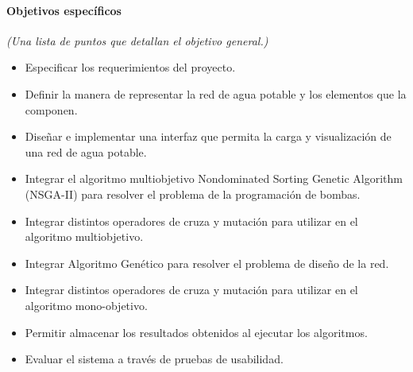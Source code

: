 \documentclass[11pt,letterpaper]{article}
\begin{document}
\paragraph{Objetivos específicos} \emph{(Una lista de puntos que detallan el objetivo general.)}
\begin{itemize}
\item Especificar los requerimientos del proyecto.
\item Definir la manera de representar la red de agua potable y los elementos que la componen.
\item Diseñar e implementar una interfaz que permita la carga y visualización de una red de agua potable.
\item Integrar el algoritmo multiobjetivo Nondominated Sorting Genetic Algorithm (NSGA-II) para resolver el problema de la programación de bombas.
\item Integrar distintos operadores de cruza y mutación para utilizar en el algoritmo multiobjetivo.
\item Integrar Algoritmo Genético para resolver el problema de diseño de la red.
\item Integrar distintos operadores de cruza y mutación para utilizar en el algoritmo mono-objetivo.
\item Permitir almacenar los resultados obtenidos al ejecutar los algoritmos.
\item Evaluar el sistema a través de pruebas de usabilidad.
\end{itemize}
\end{document}
